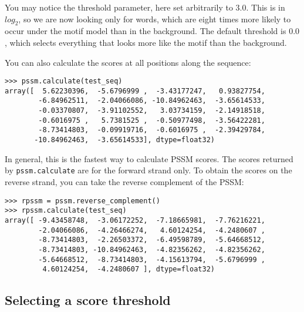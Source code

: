\documentclass{report}
\begin{document}
You may notice the threshold parameter, here set arbitrarily to
$3.0$. This is in $log_2$, so we are now looking only for words, which
are eight times more likely to occur under the motif model than in the
background. The default threshold is $0.0$, which selects everything
that looks more like the motif than the background.

You can also calculate the scores at all positions along the sequence:
\begin{verbatim}
>>> pssm.calculate(test_seq)
array([  5.62230396,  -5.6796999 ,  -3.43177247,   0.93827754,
        -6.84962511,  -2.04066086, -10.84962463,  -3.65614533,
        -0.03370807,  -3.91102552,   3.03734159,  -2.14918518,
        -0.6016975 ,   5.7381525 ,  -0.50977498,  -3.56422281,
        -8.73414803,  -0.09919716,  -0.6016975 ,  -2.39429784,
       -10.84962463,  -3.65614533], dtype=float32)
\end{verbatim}
In general, this is the fastest way to calculate PSSM scores.
The scores returned by \verb+pssm.calculate+ are for the forward strand
only. To obtain the scores on the reverse strand, you can take the reverse
complement of the PSSM:
\begin{verbatim}
>>> rpssm = pssm.reverse_complement()
>>> rpssm.calculate(test_seq)
array([ -9.43458748,  -3.06172252,  -7.18665981,  -7.76216221,
        -2.04066086,  -4.26466274,   4.60124254,  -4.2480607 ,
        -8.73414803,  -2.26503372,  -6.49598789,  -5.64668512,
        -8.73414803, -10.84962463,  -4.82356262,  -4.82356262,
        -5.64668512,  -8.73414803,  -4.15613794,  -5.6796999 ,
         4.60124254,  -4.2480607 ], dtype=float32)
\end{verbatim}

\subsection{Selecting a score threshold}
\end{document}
